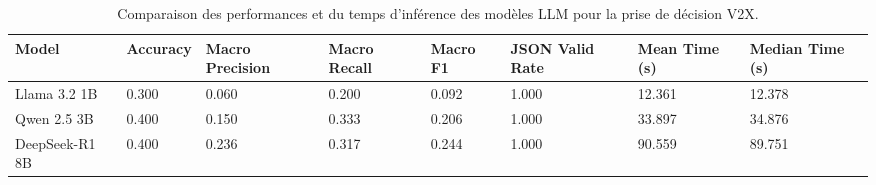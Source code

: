 \begin{table}
\caption{Comparaison des performances et du temps d'inférence des modèles LLM pour la prise de décision V2X.}
\label{tab:llm_model_comparison}
\begin{tabular}{llllllll}
\toprule
Model & Accuracy & Macro Precision & Macro Recall & Macro F1 & JSON Valid Rate & Mean Time (s) & Median Time (s) \\
\midrule
Llama 3.2 1B & 0.300 & 0.060 & 0.200 & 0.092 & 1.000 & 12.361 & 12.378 \\
Qwen 2.5 3B & 0.400 & 0.150 & 0.333 & 0.206 & 1.000 & 33.897 & 34.876 \\
DeepSeek-R1 8B & 0.400 & 0.236 & 0.317 & 0.244 & 1.000 & 90.559 & 89.751 \\
\bottomrule
\end{tabular}
\end{table}
